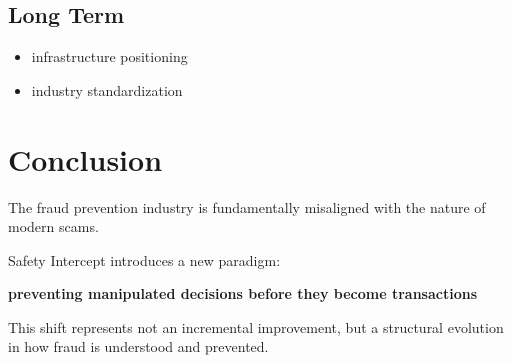 \documentclass[11pt]{article}
\begin{document}
\subsection{Long Term}

\begin{itemize}
    \item infrastructure positioning
    \item industry standardization
\end{itemize}

\section{Conclusion}

The fraud prevention industry is fundamentally misaligned with the nature of modern scams.

Safety Intercept introduces a new paradigm:
\begin{center}
\textbf{preventing manipulated decisions before they become transactions}
\end{center}

This shift represents not an incremental improvement, but a structural evolution in how fraud is understood and prevented.
\end{document}
